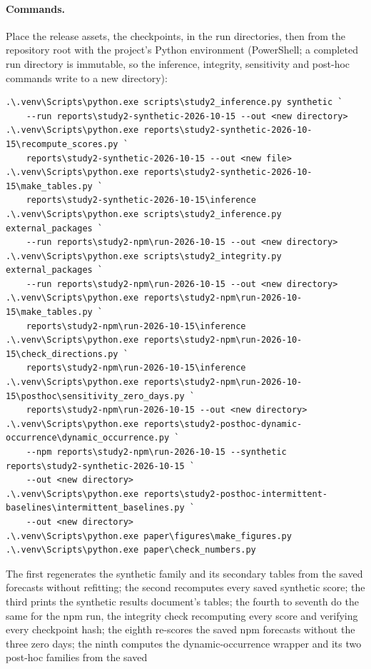 \paragraph{Commands.} Place the release assets, the checkpoints, in the run directories, then from the
repository root with the project's Python environment (PowerShell; a completed run directory is immutable,
so the inference, integrity, sensitivity and post-hoc commands write to a new directory):
{\footnotesize
\begin{verbatim}
.\.venv\Scripts\python.exe scripts\study2_inference.py synthetic `
    --run reports\study2-synthetic-2026-10-15 --out <new directory>
.\.venv\Scripts\python.exe reports\study2-synthetic-2026-10-15\recompute_scores.py `
    reports\study2-synthetic-2026-10-15 --out <new file>
.\.venv\Scripts\python.exe reports\study2-synthetic-2026-10-15\make_tables.py `
    reports\study2-synthetic-2026-10-15\inference
.\.venv\Scripts\python.exe scripts\study2_inference.py external_packages `
    --run reports\study2-npm\run-2026-10-15 --out <new directory>
.\.venv\Scripts\python.exe scripts\study2_integrity.py external_packages `
    --run reports\study2-npm\run-2026-10-15 --out <new directory>
.\.venv\Scripts\python.exe reports\study2-npm\run-2026-10-15\make_tables.py `
    reports\study2-npm\run-2026-10-15\inference
.\.venv\Scripts\python.exe reports\study2-npm\run-2026-10-15\check_directions.py `
    reports\study2-npm\run-2026-10-15\inference
.\.venv\Scripts\python.exe reports\study2-npm\run-2026-10-15\posthoc\sensitivity_zero_days.py `
    reports\study2-npm\run-2026-10-15 --out <new directory>
.\.venv\Scripts\python.exe reports\study2-posthoc-dynamic-occurrence\dynamic_occurrence.py `
    --npm reports\study2-npm\run-2026-10-15 --synthetic reports\study2-synthetic-2026-10-15 `
    --out <new directory>
.\.venv\Scripts\python.exe reports\study2-posthoc-intermittent-baselines\intermittent_baselines.py `
    --out <new directory>
.\.venv\Scripts\python.exe paper\figures\make_figures.py
.\.venv\Scripts\python.exe paper\check_numbers.py
\end{verbatim}}
The first regenerates the synthetic family and its secondary tables from the saved forecasts without
refitting; the second recomputes every saved synthetic score; the third prints the synthetic results
document's tables; the fourth to seventh do the same for the npm run, the integrity check recomputing every
score and verifying every checkpoint hash; the eighth re-scores the saved npm forecasts without the three
zero days; the ninth computes the dynamic-occurrence wrapper and its two post-hoc families from the saved
